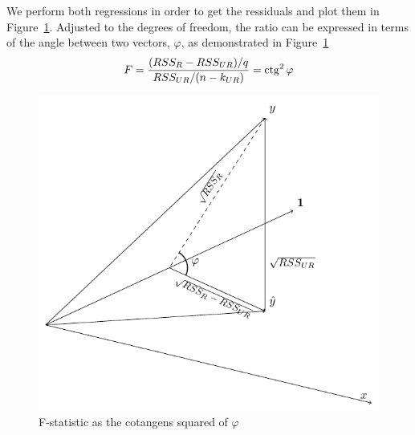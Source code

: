 We perform both regressions in order to get the ressiduals and plot them
in Figure~\ref{fig:ftest}.
Adjusted to the degrees of freedom, the ratio can be expressed in terms of the
angle between two vectors, $\varphi$, as demonstrated in Figure~\ref{fig:ftest}
\[
F = \frac{(RSS_{R} - RSS_{UR})/q}{RSS_{UR}/(n-k_{UR})} = \operatorname{ctg}^2 \varphi
\]

\begin{figure}
\centering
\includegraphics[width=0.55\linewidth]{figures/ftest.pdf}
\caption{F-statistic as the cotangens squared of $\varphi$}
\label{fig:ftest}
\end{figure}
